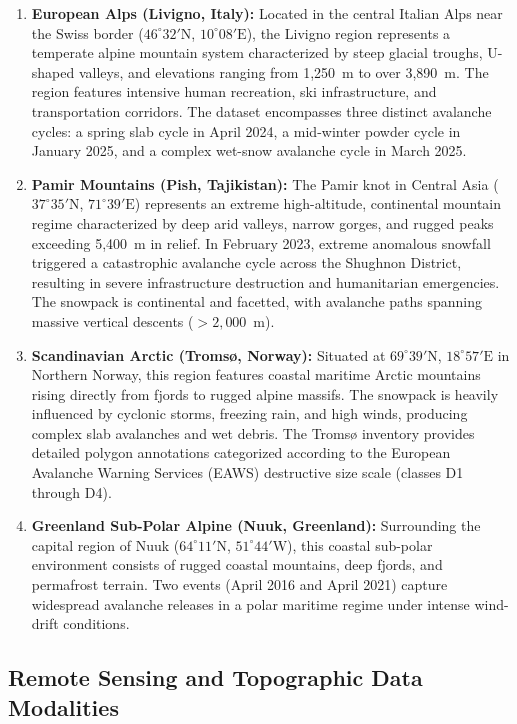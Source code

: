 \begin{enumerate}
    \item \textbf{European Alps (Livigno, Italy):} Located in the central Italian Alps near the Swiss border ($46^\circ32'\text{N}$, $10^\circ08'\text{E}$), the Livigno region represents a temperate alpine mountain system characterized by steep glacial troughs, U-shaped valleys, and elevations ranging from 1,250~m to over 3,890~m. The region features intensive human recreation, ski infrastructure, and transportation corridors. The dataset encompasses three distinct avalanche cycles: a spring slab cycle in April 2024, a mid-winter powder cycle in January 2025, and a complex wet-snow avalanche cycle in March 2025.
    \item \textbf{Pamir Mountains (Pish, Tajikistan):} The Pamir knot in Central Asia ($37^\circ35'\text{N}$, $71^\circ39'\text{E}$) represents an extreme high-altitude, continental mountain regime characterized by deep arid valleys, narrow gorges, and rugged peaks exceeding 5,400~m in relief. In February 2023, extreme anomalous snowfall triggered a catastrophic avalanche cycle across the Shughnon District, resulting in severe infrastructure destruction and humanitarian emergencies. The snowpack is continental and facetted, with avalanche paths spanning massive vertical descents ($>2,000$~m).
    \item \textbf{Scandinavian Arctic (Troms{\o}, Norway):} Situated at $69^\circ39'\text{N}$, $18^\circ57'\text{E}$ in Northern Norway, this region features coastal maritime Arctic mountains rising directly from fjords to rugged alpine massifs. The snowpack is heavily influenced by cyclonic storms, freezing rain, and high winds, producing complex slab avalanches and wet debris. The Troms{\o} inventory provides detailed polygon annotations categorized according to the European Avalanche Warning Services (EAWS) destructive size scale (classes D1 through D4).
    \item \textbf{Greenland Sub-Polar Alpine (Nuuk, Greenland):} Surrounding the capital region of Nuuk ($64^\circ11'\text{N}$, $51^\circ44'\text{W}$), this coastal sub-polar environment consists of rugged coastal mountains, deep fjords, and permafrost terrain. Two events (April 2016 and April 2021) capture widespread avalanche releases in a polar maritime regime under intense wind-drift conditions.
\end{enumerate}

\subsection{Remote Sensing and Topographic Data Modalities}
\label{sec:data:modalities}

